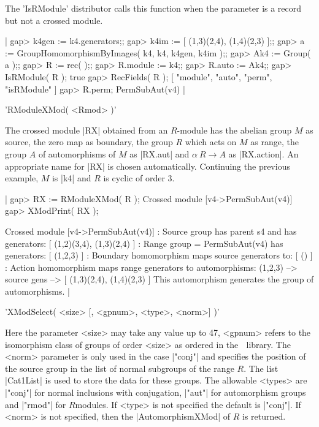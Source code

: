The 'IsRModule' distributor calls  this function when the parameter is
a record but not a crossed module.

|    gap> k4gen := k4.generators;;
    gap> k4im := [ (1,3)(2,4), (1,4)(2,3) ];;
    gap> a := GroupHomomorphismByImages( k4, k4, k4gen, k4im );;
    gap> Ak4 := Group( a );;
    gap> R := rec( );;
    gap> R.module := k4;;
    gap> R.auto := Ak4;;
    gap> IsRModule( R );
    true
    gap> RecFields( R );
    [ "module", "auto", "perm", "isRModule" ]
    gap> R.perm;
    PermSubAut(v4)   |

%

'RModuleXMod( <Rmod> )'

The crossed module  |RX| obtained from an  $R$-module  has the abelian
group $M$ as  source, the zero  map  as boundary, the group  $R$ which
acts on $M$ as  range,   the group  $A$  of  automorphisms of  $M$  as
|RX.aut| and $\alpha \: R \to A$  as |RX.action|.  An appropriate name
for |RX|  is chosen automatically.    Continuing the previous example,
$M$ is |k4| and $R$ is cyclic of order $3$.

|    gap> RX := RModuleXMod( R );
    Crossed module [v4->PermSubAut(v4)]
    gap> XModPrint( RX );

    Crossed module [v4->PermSubAut(v4)]
    : Source group has parent s4 and has generators:
      [ (1,2)(3,4), (1,3)(2,4) ]
    : Range group = PermSubAut(v4) has generators:
      [ (1,2,3) ]
    : Boundary homomorphism maps source generators to:
      [ () ]
    : Action homomorphism maps range generators to automorphisms:
      (1,2,3) --> { source gens --> [ (1,3)(2,4), (1,4)(2,3) ] }
      This automorphism generates the group of automorphisms.    |

%

'XModSelect( <size> [, <gpnum>, <type>, <norm>] )'

Here the parameter <size> may take any value  up to 47, <gpnum> refers
to the isomorphism class of  groups of order <size>  as ordered in the
\GAP $\;$   library.  The <norm>  parameter  is only  used in the case
|"conj"| and specifies the position of the source group in the list of
normal subgroups  of the range $R$.   The  list |Cat1List|  is used to
store the data for these  groups.  The allowable <types> are  |"conj"|
for  normal  inclusions with  conjugation,   |"aut"|  for automorphism
groups  and |"rmod"| for $R$modules.   If <type>  is not specified the
default  is  |"conj"|.  If   <norm>     is not specified,  then    the
|AutomorphismXMod| of $R$ is returned.


